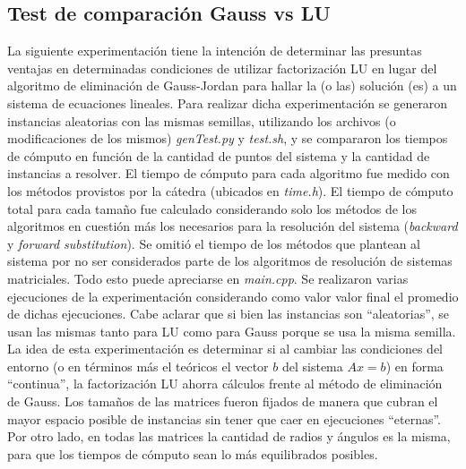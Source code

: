 \subsection{Test de comparación Gauss vs LU}
La siguiente experimentación tiene la intención de determinar las presuntas ventajas en determinadas condiciones de utilizar factorización LU en lugar del algoritmo de eliminación de Gauss-Jordan para hallar la (o las) solución (es) a un sistema de ecuaciones lineales. Para realizar dicha experimentación se generaron instancias aleatorias con las mismas semillas, utilizando los archivos (o modificaciones de los mismos) \emph{genTest.py} y \emph{test.sh}, y se compararon los tiempos de cómputo en función de la cantidad de puntos del sistema y la cantidad de instancias a resolver. El tiempo de cómputo para cada algoritmo fue medido con los métodos provistos por la cátedra (ubicados en \emph{time.h}). El tiempo de cómputo total para cada tamaño fue calculado considerando solo los métodos de los algoritmos en cuestión más los necesarios para la resolución del sistema (\emph{backward} y \emph{forward} \emph{substitution}). Se omitió el tiempo de los métodos que plantean al sistema por no ser considerados parte de los algoritmos de resolución de sistemas matriciales. Todo esto puede apreciarse en \emph{main.cpp}. Se realizaron varias ejecuciones de la experimentación considerando como valor valor final el promedio de dichas ejecuciones. Cabe aclarar que si bien las instancias son ``aleatorias'', se usan las mismas tanto para LU como para Gauss porque se usa la misma semilla. La idea de esta experimentación es determinar si al cambiar las condiciones del entorno (o en términos más el teóricos el vector $b$ del sistema $Ax=b$) en forma ``continua'', la factorización LU ahorra cálculos frente al método de eliminación de Gauss. Los tamaños de las matrices fueron fijados de manera que cubran el mayor espacio posible de instancias sin tener que caer en ejecuciones ``eternas''. Por otro lado, en todas las matrices la cantidad de radios y ángulos es la misma, para que los tiempos de cómputo sean lo más equilibrados posibles.
